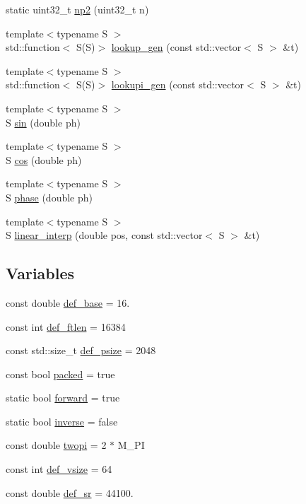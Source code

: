 \begin{DoxyCompactItemize}
\item 
static uint32\+\_\+t \hyperlink{namespace_aurora_a49b6f6d92479d80271ced42627154066}{np2} (uint32\+\_\+t n)
\item 
{\footnotesize template$<$typename S $>$ }\\std\+::function$<$ S(S)$>$ \hyperlink{namespace_aurora_ade912bee8dbe0351b2193809ce592d8b}{lookup\+\_\+gen} (const std\+::vector$<$ S $>$ \&t)
\item 
{\footnotesize template$<$typename S $>$ }\\std\+::function$<$ S(S)$>$ \hyperlink{namespace_aurora_a043c55515e053a8d6f31ed7077a1bea6}{lookupi\+\_\+gen} (const std\+::vector$<$ S $>$ \&t)
\item 
{\footnotesize template$<$typename S $>$ }\\S \hyperlink{namespace_aurora_a388ea5736944d8887f5586afd45a03b8}{sin} (double ph)
\item 
{\footnotesize template$<$typename S $>$ }\\S \hyperlink{namespace_aurora_ab6ef1b966b8f27d107fcabe1027a677a}{cos} (double ph)
\item 
{\footnotesize template$<$typename S $>$ }\\S \hyperlink{namespace_aurora_a2fab91108d29c7101741bcd2ebe1ba72}{phase} (double ph)
\item 
{\footnotesize template$<$typename S $>$ }\\S \hyperlink{namespace_aurora_acdc5f35b9cbf54f7fc84a423d76bd488}{linear\+\_\+interp} (double pos, const std\+::vector$<$ S $>$ \&t)
\end{DoxyCompactItemize}
\subsection*{Variables}
\begin{DoxyCompactItemize}
\item 
const double \hyperlink{namespace_aurora_acb267dff62f74484893c2d5b679b78bf}{def\+\_\+base} = 16.
\item 
const int \hyperlink{namespace_aurora_a14dabfd9feedfa09c0e6f86d2627f006}{def\+\_\+ftlen} = 16384
\item 
const std\+::size\+\_\+t \hyperlink{namespace_aurora_a080d03c33477d9c6322278722ca8e472}{def\+\_\+psize} = 2048
\item 
const bool \hyperlink{namespace_aurora_a3e70ffc9ea5c526dcd66b1b14e43f175}{packed} = true
\item 
static bool \hyperlink{namespace_aurora_a20b1bd3f1b34b8676e26d07718dac352}{forward} = true
\item 
static bool \hyperlink{namespace_aurora_ac22c4e2e10572cbb6f64f3bd1cd595b5}{inverse} = false
\item 
const double \hyperlink{namespace_aurora_a4c08f8416c2b35d5001062f121459b5a}{twopi} = 2 $\ast$ M\+\_\+\+PI
\item 
const int \hyperlink{namespace_aurora_afaaddf667a06e7ce23c667a8b7295263}{def\+\_\+vsize} = 64
\item 
const double \hyperlink{namespace_aurora_ad49263d809bea98dd422e95bc91bc03e}{def\+\_\+sr} = 44100.
\end{DoxyCompactItemize}


